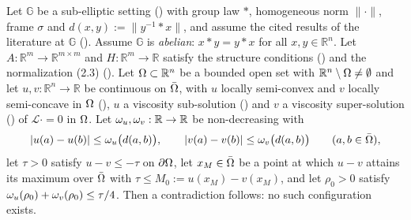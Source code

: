 \begin{theorem}
Let $\mathbb G$ be a sub-elliptic setting () with group law $*$,
homogeneous norm $\|\cdot\|$, frame $\sigma$ and $d(x,y):=\|y^{-1}*x\|$, and assume the
cited results of the literature at $\mathbb G$ (). Assume
$\mathbb G$ is
\emph{abelian}: $x*y=y*x$ for all $x,y\in\mathbb R^{n}$. Let
$A:\mathbb R^{m}\to\mathbb R^{m\times m}$ and $H:\mathbb R^{m}\to\mathbb R$ satisfy the
structure conditions () and the normalization (2.3)
(). Let $\Omega\subset\mathbb R^{n}$ be a bounded open set with
$\mathbb R^{n}\setminus\Omega\ne\emptyset$ and let $u,v:\mathbb R^{n}\to\mathbb R$ be continuous on
$\bar{\Omega}$, with $u$ locally semi-convex and $v$ locally semi-concave in $\Omega$
(), $u$ a viscosity sub-solution () and
$v$ a viscosity super-solution () of $\mathcal L\cdot=0$ in $\Omega$.
Let $\omega_u,\omega_v:\mathbb R\to\mathbb R$ be non-decreasing with
\[
 |u(a)-u(b)|\le\omega_u\big(d(a,b)\big),\qquad |v(a)-v(b)|\le\omega_v\big(d(a,b)\big)
 \qquad(a,b\in\bar{\Omega}),
\]
let $\tau>0$ satisfy $u-v\le-\tau$ on $\partial\Omega$, let $x_M\in\bar{\Omega}$ be a point at which
$u-v$ attains its maximum over $\bar{\Omega}$ with $\tau\le M_0:=u(x_M)-v(x_M)$, and let
$\rho_0>0$ satisfy $\omega_u(\rho_0)+\omega_v(\rho_0)\le\tau/4$. Then a contradiction follows: no
such configuration exists.
\end{theorem}
